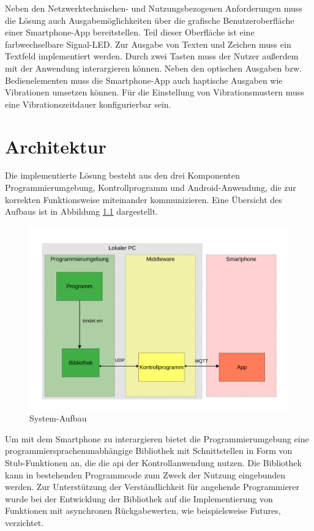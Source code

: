 \documentclass[11pt,a4paper]{report}
\begin{document}
Neben den Netzwerktechnischen- und Nutzungsbezogenen Anforderungen muss die Lösung auch Ausgabemöglichkeiten über die grafische Benutzeroberfläche einer Smartphone-App bereitstellen.
Teil dieser Oberfläche ist eine farbwechselbare Signal-LED.
Zur Ausgabe von Texten und Zeichen muss ein Textfeld implementiert werden.
Durch zwei Tasten muss der Nutzer außerdem mit der Anwendung interargieren können.
Neben den optischen Ausgaben bzw. Bedienelementen muss die Smartphone-App auch haptische Ausgaben wie Vibrationen umsetzen können.
Für die Einstellung von Vibrationsmustern muss eine Vibrationszeitdauer konfigurierbar sein.

\chapter{Architektur} \label{chap:architektur}
Die implementierte Lösung besteht aus den drei Komponenten Programmierumgebung, Kontrollprogramm und Android-Anwendung, die zur korrekten Funktionsweise miteinander kommunizieren.
Eine Übersicht des Aufbaus ist in Abbildung \ref{fig:design} dargestellt.
\begin{figure}[htbp]
\centering
\includegraphics[width=\textwidth]{images/framework.pdf}
\caption{System-Aufbau}
\label{fig:design}
\end{figure}
Um mit dem Smartphone zu interargieren bietet die Programmierumgebung eine programmiersprachenunabhängige Bibliothek mit Schnittstellen in Form von Stub-Funktionen an, die die \acrshort{api} der Kontrollanwendung nutzen.
Die Bibliothek kann in bestehenden Programmcode zum Zweck der Nutzung eingebunden werden.
Zur Unterstützung der Verständlichkeit für angehende Programmierer wurde bei der Entwicklung der Bibliothek auf die Implementierung von Funktionen mit asynchronen Rückgabewerten, wie beispielsweise Futures, verzichtet.
\end{document}
